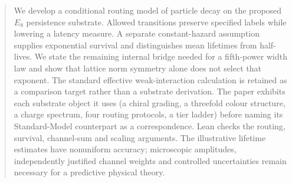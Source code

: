 \begin{abstract}
We develop a conditional routing model of particle decay on the proposed $E_8$ persistence substrate. Allowed transitions preserve specified labels while lowering a latency measure. A separate constant-hazard assumption supplies exponential survival and distinguishes mean lifetimes from half-lives. We state the remaining internal bridge needed for a fifth-power width law and show that lattice norm symmetry alone does not select that exponent. The standard effective weak-interaction calculation is retained as a comparison target rather than a substrate derivation. The paper exhibits each substrate object it uses (a chiral grading, a threefold colour structure, a charge spectrum, four routing protocols, a tier ladder) before naming its Standard-Model counterpart as a correspondence. Lean checks the routing, survival, channel-sum and scaling arguments. The illustrative lifetime estimates have nonuniform accuracy; microscopic amplitudes, independently justified channel weights and controlled uncertainties remain necessary for a predictive physical theory.
\end{abstract}

